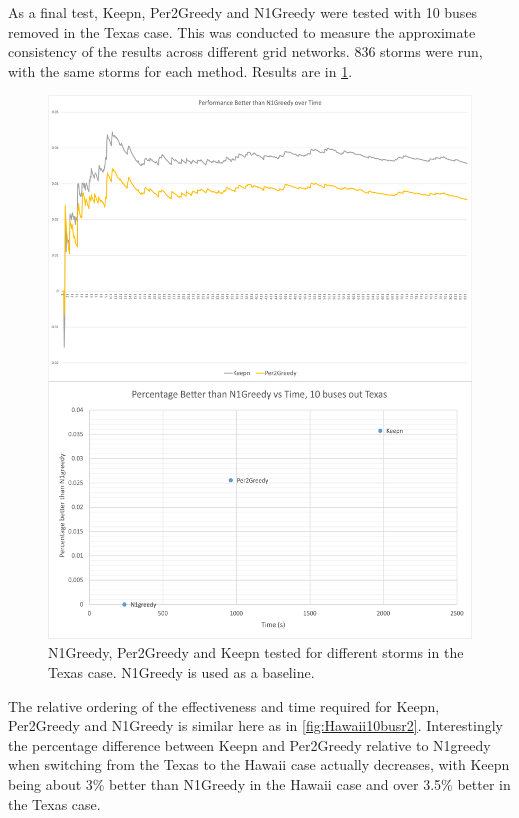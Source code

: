 \documentclass[12pt]{article}
\begin{document}
As a final test, Keepn, Per2Greedy and N1Greedy were tested with 10 buses removed in the Texas case. This was conducted to measure the approximate consistency of the results across different grid networks. 836 storms were run, with the same storms for each method. Results are in \ref{fig:Texas10busr2}.

\begin{figure}[ht]
    \centering %
    \includegraphics[scale = 0.24]{Texas10busr2.pdf}
    \caption[Second Testing Set - 10 buses removed, Texas Case]{N1Greedy, Per2Greedy and Keepn tested for different storms in the Texas case. N1Greedy is used as a baseline.}
    \label{fig:Texas10busr2}
\end{figure}

The relative ordering of the effectiveness and time required for Keepn, Per2Greedy and N1Greedy is similar here as in \ref{fig:Hawaii10busr2}. Interestingly the percentage difference between Keepn and Per2Greedy relative to N1greedy when switching from the Texas to the Hawaii case actually decreases, with Keepn being about 3\% better than N1Greedy in the Hawaii case and over 3.5\% better in the Texas case. \par
\end{document}
